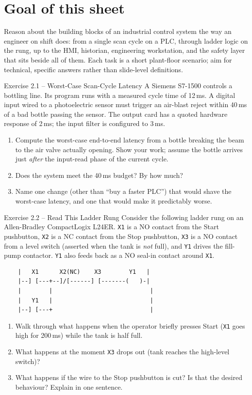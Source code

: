 \documentclass[11pt,a4paper]{article}
\begin{document}
\sheetheader

\section*{Goal of this sheet}
Reason about the building blocks of an industrial control system the way an
engineer on shift does: from a single scan cycle on a PLC, through ladder
logic on the rung, up to the HMI, historian, engineering workstation, and the
safety layer that sits beside all of them. Each task is a short
plant-floor scenario; aim for technical, specific answers rather than
slide-level definitions.

\begin{taskbox}{Exercise 2.1 -- Worst-Case Scan-Cycle Latency}
A Siemens S7-1500 controls a bottling line. Its program runs with a measured
cycle time of 12\,ms. A digital input wired to a photoelectric
sensor must trigger an air-blast reject within 40\,ms of a bad
bottle passing the sensor. The output card has a quoted hardware response of
2\,ms; the input filter is configured to 3\,ms.
\begin{enumerate}
  \item Compute the worst-case end-to-end latency from a bottle breaking the
    beam to the air valve actually opening. Show your work; assume the bottle
    arrives just \emph{after} the input-read phase of the current cycle.
  \item Does the system meet the 40\,ms budget? By how much?
  \item Name one change (other than ``buy a faster PLC'') that would shave
    the worst-case latency, and one that would make it predictably worse.
\end{enumerate}
\end{taskbox}

\begin{taskbox}{Exercise 2.2 -- Read This Ladder Rung}
Consider the following ladder rung on an Allen-Bradley CompactLogix L24ER.
\texttt{X1} is a NO contact from the Start pushbutton, \texttt{X2} is a NC
contact from the Stop pushbutton, \texttt{X3} is a NO contact from a level
switch (asserted when the tank is \emph{not} full), and \texttt{Y1} drives the
fill-pump contactor. \texttt{Y1} also feeds back as a NO seal-in contact
around \texttt{X1}.
\begin{verbatim}
    |   X1      X2(NC)    X3        Y1   |
    |--] [---+--]/[------] [-------(   )-|
    |        |                            |
    |   Y1   |                            |
    |--] [---+                            |
\end{verbatim}
\begin{enumerate}
  \item Walk through what happens when the operator briefly presses Start
    (\texttt{X1} goes high for 200\,ms) while the tank is half
    full.
  \item What happens at the moment \texttt{X3} drops out (tank reaches the
    high-level switch)?
  \item What happens if the wire to the Stop pushbutton is cut? Is that the
    desired behaviour? Explain in one sentence.
\end{enumerate}
\end{taskbox}
\end{document}
